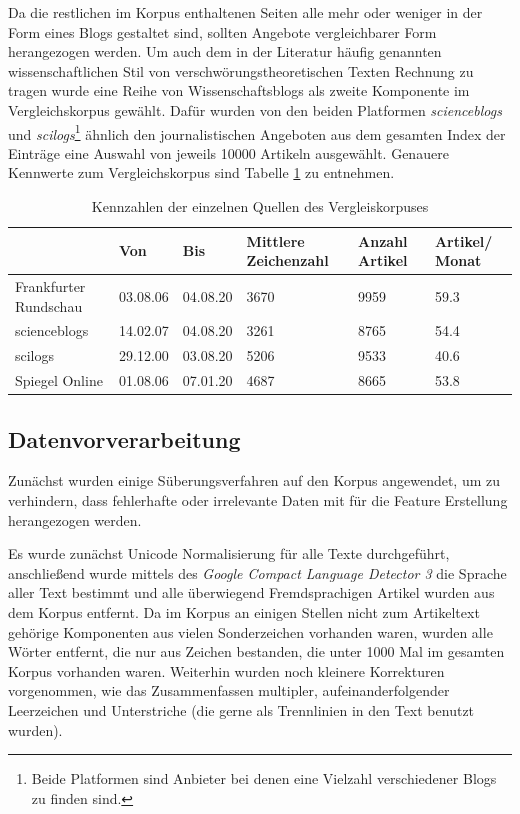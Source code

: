 Da die restlichen im Korpus enthaltenen Seiten alle mehr oder weniger in der Form eines Blogs gestaltet sind, sollten Angebote vergleichbarer Form herangezogen werden.
Um auch dem in der Literatur häufig genannten wissenschaftlichen Stil von verschwörungstheoretischen Texten Rechnung zu tragen wurde eine Reihe von Wissenschaftsblogs als zweite Komponente im Vergleichskorpus gewählt.
Dafür wurden von den beiden Platformen \textit{scienceblogs} und \textit{scilogs}\footnote{Beide Platformen sind Anbieter bei denen eine Vielzahl verschiedener Blogs zu finden sind.} ähnlich den journalistischen Angeboten aus dem gesamten Index der Einträge eine Auswahl von jeweils 10000 Artikeln ausgewählt.
Genauere Kennwerte zum Vergleichskorpus sind Tabelle \ref{comcorpus-stats} zu entnehmen.

\begin{table}
    \begin{center}
        \begin{tabularx}{\textwidth}{l|XXXXX}
            \toprule
            & Von & Bis & Mittlere Zeichenzahl & Anzahl Artikel & Artikel/ Monat\\
            \midrule
            Frankfurter Rundschau & 03.08.06 & 04.08.20 & 3670 & 9959 & 59.3\\
            scienceblogs & 14.02.07 & 04.08.20 & 3261 & 8765 & 54.4\\
            scilogs & 29.12.00 & 03.08.20 & 5206 & 9533 & 40.6\\
            Spiegel Online & 01.08.06 & 07.01.20 & 4687 & 8665 & 53.8\\
            \bottomrule
        \end{tabularx}
        \caption{Kennzahlen der einzelnen Quellen des Vergleiskorpuses}
        \label{comcorpus-stats}
    \end{center}
\end{table}

\subsection{Datenvorverarbeitung}

Zunächst wurden einige Süberungsverfahren auf den Korpus angewendet, um zu verhindern, dass fehlerhafte oder irrelevante Daten mit für die Feature Erstellung herangezogen werden.

Es wurde zunächst Unicode Normalisierung für alle Texte durchgeführt, anschließend wurde mittels des \textit{Google Compact Language Detector 3} \parencite[][]{cld3} die Sprache aller Text bestimmt und alle überwiegend Fremdsprachigen Artikel wurden aus dem Korpus entfernt.
Da im Korpus an einigen Stellen nicht zum Artikeltext gehörige Komponenten aus vielen Sonderzeichen vorhanden waren, wurden alle Wörter entfernt, die nur aus Zeichen bestanden, die unter 1000 Mal im gesamten Korpus vorhanden waren.
Weiterhin wurden noch kleinere Korrekturen vorgenommen, wie das Zusammenfassen multipler, aufeinanderfolgender Leerzeichen und Unterstriche (die gerne als Trennlinien in den Text benutzt wurden).

